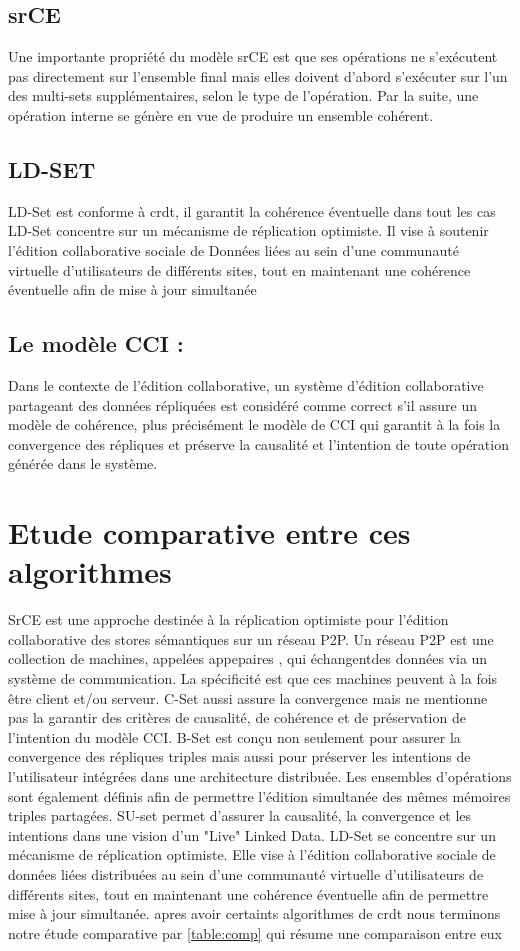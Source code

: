 \documentclass[12pt]{report}
\begin{document}
\subsection{srCE}
Une importante propriété du modèle srCE est que ses opérations ne s’exécutent pas 
directement sur l’ensemble final mais elles doivent d’abord s’exécuter sur l’un des multi-sets 
supplémentaires, selon le type de l’opération. Par la suite, une opération interne se génère en vue 
de produire un ensemble cohérent.
\subsection{LD-SET}
LD-Set est conforme à \acs{crdt}, il garantit la cohérence éventuelle dans tout les cas LD-Set concentre sur un mécanisme de réplication optimiste. Il vise à
soutenir l’édition collaborative sociale de Données liées au sein d’une communauté virtuelle d’utilisateurs de différents sites, tout en maintenant une cohérence éventuelle afin de mise à jour simultanée

\subsection{Le modèle CCI :}
Dans le contexte de l’édition collaborative, un système d’édition collaborative partageant des
données répliquées est considéré comme correct s’il assure un modèle de cohérence, plus
précisément le modèle de CCI qui garantit à la fois la convergence des répliques et
préserve la causalité et l’intention de toute opération générée dans le système.
\section{Etude comparative entre ces algorithmes}

SrCE est une approche destinée à la réplication optimiste pour l’édition collaborative des stores
sémantiques sur un réseau P2P.
Un réseau P2P est une collection de machines, appelées appepaires , qui échangentdes données via un
système de communication. La spécificité est que ces machines peuvent à la fois être client et/ou serveur.
C-Set aussi assure la convergence mais ne mentionne pas la garantir des critères de causalité, de cohérence et de préservation de l'intention du modèle CCI.
B-Set est conçu non seulement pour assurer la convergence des répliques triples mais aussi pour
préserver les intentions de l'utilisateur intégrées dans une architecture distribuée. Les ensembles
d'opérations sont également définis afin de permettre l'édition simultanée des mêmes mémoires triples
partagées.
SU-set permet d'assurer la causalité, la convergence et les intentions dans une vision d'un "Live" Linked
Data.
LD-Set se concentre sur un mécanisme de réplication optimiste. Elle vise à
l'édition collaborative sociale de données liées distribuées au sein d'une communauté virtuelle
d'utilisateurs de différents sites, tout en maintenant une cohérence éventuelle afin de permettre
mise à jour simultanée.
apres avoir certaints algorithmes de \acs{crdt} nous terminons notre étude comparative par \ref{table:comp} qui
résume une comparaison entre eux
\end{document}
